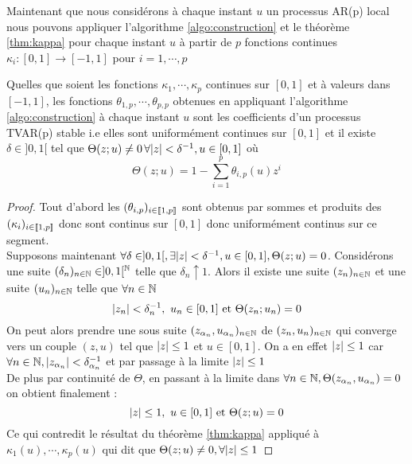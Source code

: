 \documentclass{report}
\begin{document}
Maintenant que nous considérons à chaque instant $u$ un processus AR(p) local nous pouvons appliquer l'algorithme \ref{algo:construction} et le théorème \ref{thm:kappa} pour chaque instant $u$ à partir de $p$ fonctions continues $\kappa_i :[0,1] \to [-1,1]$ pour $i=1,\cdots,p$
\begin{Thm}
\label{thm:kappa_u}
Quelles que soient les fonctions $\kappa_1, \cdots, \kappa_p$ continues sur $[0,1]$ et à valeurs dans $[-1,1]$, les fonctions $\theta_{1,p},\cdots, \theta_{p,p}$ obtenues en appliquant l'algorithme \ref{algo:construction} à chaque instant $u$ sont les coefficients d'un processus TVAR(p) stable i.e elles sont uniformément continues sur $[0,1]$ et il existe $\delta \in ]0,1[$ tel que $\Theta(z;u)\neq 0 \, \forall { \left| z \right|} < \delta^{-1}, u\in [0,1]$ où 
\[
\Theta(z;u) = 1 - \sum_{i=1}^p \theta_{i,p}(u) z^i
\]
\end{Thm}
\begin{proof} 
Tout d'abord les $(\theta_{i,p})_{i\in { \left\llbracket 1,p \right\rrbracket}}$ sont obtenus par sommes et produits des $(\kappa_i)_{i\in { \left\llbracket 1,p \right\rrbracket}}$ donc sont continus sur $[0,1]$ donc uniformément continus sur ce segment. \\
Supposons maintenant $\forall \delta \in ]0,1[, \exists { \left| z \right|} < \delta^{-1}, u\in [0,1], \Theta(z;u) = 0$. Considérons une suite $(\delta_n)_{n\in \mathbb{N}} \in ]0,1[^{\mathbb{N}}$ telle que $\delta_n \uparrow 1$. Alors il existe une suite $(z_n)_{n\in \mathbb{N}}$ et une suite $(u_n)_{n\in \mathbb{N}}$ telle que $\forall n \in \mathbb{N}$
$$
{ \left| z_n \right|} < \delta_n^{-1},
\,\,
u_n \in [0,1] 
\mbox{ et }
\Theta(z_n;u_n) = 0
$$
On peut alors prendre une sous suite $(z_{\alpha_n}, u_{\alpha_n})_{n\in \mathbb{N}}$ de $(z_n,u_n)_{n\in \mathbb{N}}$ qui converge vers un couple $(z,u)$ tel que ${ \left| z \right|} \leq 1$ et $u\in [0,1]$. On a en effet ${ \left| z \right|} \leq 1$ car $\forall n\in \mathbb{N}, { \left| z_{\alpha_n} \right|} < \delta_{\alpha_n}^{-1}$ et par passage à la limite ${ \left| z \right|} \leq 1$ \\
De plus par continuité de $\Theta$, en passant à la limite dans $\forall n\in \mathbb{N}, \Theta(z_{\alpha_n}, u_{\alpha_n}) = 0$ on obtient finalement :
$$
{ \left| z \right|} \leq 1,
\,\,
u \in [0,1] 
\mbox{ et }
\Theta(z;u) = 0
$$
Ce qui contredit le résultat du théorème \ref{thm:kappa} appliqué à $\kappa_1(u),\cdots,\kappa_p(u)$ qui dit que $\Theta(z;u) \neq 0, \forall { \left| z \right|}\leq 1$
\end{proof}
\end{document}
